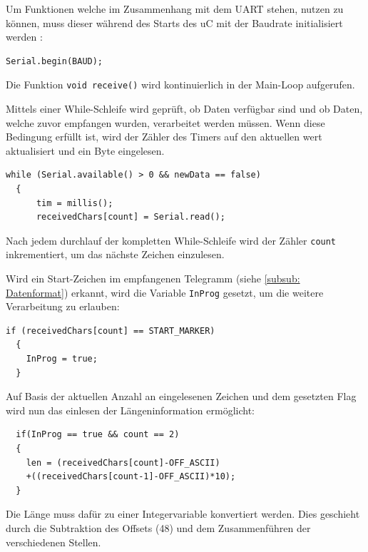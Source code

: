 Um Funktionen welche im Zusammenhang mit dem \ac{UART} stehen, nutzen zu können, muss dieser während des Starts des \ac{uC} mit der Baudrate initialisiert werden \citep{ArduinoRef}:
\begin{lstlisting}[caption={\textit{Initialiserung UART}}]
  Serial.begin(BAUD);
\end{lstlisting}

Die Funktion \lstinline!void receive()! wird kontinuierlich in der Main-Loop aufgerufen.

\smallskip


Mittels einer While-Schleife wird geprüft, ob Daten verfügbar sind und ob Daten, welche zuvor empfangen wurden, verarbeitet werden müssen. Wenn diese Bedingung erfüllt
ist, wird der Zähler des Timers auf den aktuellen wert aktualisiert und ein Byte eingelesen. 

\begin{lstlisting}[caption={\textit{Prüfen auf neue Daten}}]
  while (Serial.available() > 0 && newData == false)
  {
      tim = millis();
      receivedChars[count] = Serial.read();
\end{lstlisting}

Nach jedem durchlauf der kompletten While-Schleife wird der Zähler \lstinline!count! inkrementiert, um das nächste Zeichen einzulesen.

\newpage

Wird ein Start-Zeichen im empfangenen Telegramm (siehe \ref{subsub: Datenformat}) erkannt, wird die Variable \lstinline!InProg! gesetzt, um die weitere Verarbeitung
zu erlauben:

\begin{lstlisting}[caption={\textit{Erkennung Start-Marker}}]
  if (receivedChars[count] == START_MARKER)
  {
    InProg = true;
  }
\end{lstlisting}

Auf Basis der aktuellen Anzahl an eingelesenen Zeichen und dem gesetzten Flag wird nun das einlesen der Längeninformation ermöglicht:

\begin{lstlisting}
  if(InProg == true && count == 2)
  {
    len = (receivedChars[count]-OFF_ASCII)
    +((receivedChars[count-1]-OFF_ASCII)*10);
  }
\end{lstlisting}

Die Länge muss dafür zu einer Integervariable konvertiert werden. Dies geschieht durch die Subtraktion des Offsets (48) und dem Zusammenführen der verschiedenen Stellen.


